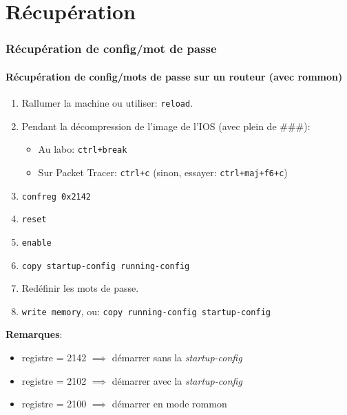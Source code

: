 \documentclass[a4paper]{article}
\begin{document}
\part{Récupération}










\section{Récupération de config/mot de passe}





\subsection{Récupération de config/mots de passe sur un routeur (avec rommon)}



\begin{enumerate}
    \item Rallumer la machine ou utiliser: \texttt{reload}.
    \item Pendant la décompression de l'image de l'IOS (avec plein de \#\#\#):
    \begin{itemize}[label=\textbf{–}]
        \item Au labo: \texttt{ctrl+break}
        \item Sur Packet Tracer: \texttt{ctrl+c} (sinon, essayer: \texttt{ctrl+maj+f6+c})
    \end{itemize}
    \item \texttt{confreg 0x2142}
    \item \texttt{reset}
    \item \texttt{enable}
    \item \texttt{copy startup-config running-config}
    \item Redéfinir les mots de passe.
    \item \texttt{write memory}, ou: \texttt{copy running-config startup-config}
\end{enumerate}
\textbf{Remarques}:
\begin{itemize}
    \item registre = 2142 $ \implies $ démarrer sans la \textit{startup-config}
    \item registre = 2102 $ \implies $ démarrer avec la \textit{startup-config}
    \item registre = 2100 $ \implies $ démarrer en mode rommon
\end{itemize}
\end{document}
